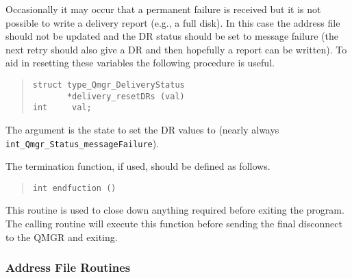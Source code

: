 Occasionally it may occur that a permanent failure is received but it
is not possible to write a delivery report (e.g., a full disk). In this
case the address file should not be updated and the DR status should
be set to message failure (the next retry should also give a DR and
then hopefully a report can be written). To aid in resetting these
variables the following procedure is useful.

\begin{quote}\begin{verbatim}
struct type_Qmgr_DeliveryStatus
       *delivery_resetDRs (val)
int     val;
\end{verbatim}\end{quote}

The argument is the state to set the DR values to (nearly always
\linebreak
\verb|int_Qmgr_Status_messageFailure|).


The termination function, if used, should be defined as follows.
\begin{quote}\begin{verbatim}
int endfuction ()
\end{verbatim}\end{quote}

This routine is used to close down anything required before exiting
the program. The calling routine will execute this function before sending
the final disconnect to the QMGR and exiting.


\subsubsection{Address File Routines}


